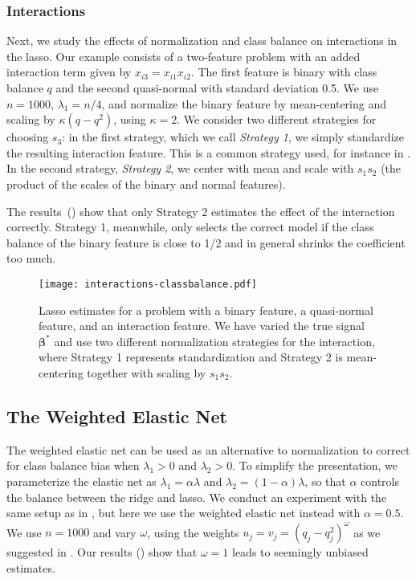 \subsubsection{Interactions}\label{sec:experiments-interactions}

Next, we study the effects of normalization and class balance on interactions in the lasso.
Our example consists of a two-feature problem with an added interaction term given by
\(x_{i3} = x_{i1}x_{i2}\). The first feature is binary with class balance \(q\) and the
second quasi-normal with standard deviation 0.5. We use \(n=1000\), \(\lambda_1 = n/4\),
and normalize the binary feature by mean-centering and scaling by \(\kappa (q - q^2)\),
using \(\kappa = 2\). We consider two different strategies for choosing \(s_3\): in the
first strategy, which we call \emph{Strategy 1}, we simply standardize the resulting
interaction feature. This is a common strategy used, for instance in
\citet{bien2013,lim2015}. In the second strategy, \emph{Strategy 2}, we center with mean
and scale with \(s_1s_2\) (the product of the scales of the binary and normal features).

The results~() show that only Strategy 2 estimates the effect of the
interaction correctly. Strategy 1, meanwhile, only selects the correct model if the class
balance of the binary feature is close to 1/2 and in general shrinks the coefficient too
much.

\begin{figure}[htpb]
  \centering
  \texttt{[image: interactions-classbalance.pdf]}
  \caption{%
    Lasso estimates for a problem with a binary feature, a quasi-normal
    feature, and an interaction feature. We have varied the true signal
    \(\bm{\beta}^*\) and use two different normalization strategies for the
    interaction, where
    Strategy 1 represents standardization and Strategy 2 is mean-centering
    together with scaling by \(s_1 s_2\).
  }
  \label{fig:interactions}
\end{figure}

\subsection{The Weighted Elastic Net}

The weighted elastic net can be used as an alternative to normalization to correct for
class balance bias when \(\lambda_1 > 0\) and \(\lambda_2 >0\). To simplify the
presentation, we parameterize the elastic net as \(\lambda_1 = \alpha \lambda \) and
\(\lambda_2 = (1-\alpha) \lambda\), so that \(\alpha\) controls the balance between the
ridge and lasso. We conduct an experiment with the same setup as in
, but here we use the weighted elastic net instead with
\(\alpha = 0.5\). We use \(n=1000\) and vary \(\omega\), using the weights \(u_j = v_j =
(q_j - q_j^2)^{\omega}\) as we suggested in . Our results
() show that \(\omega = 1\) leads to seemingly unbiased
estimates.

